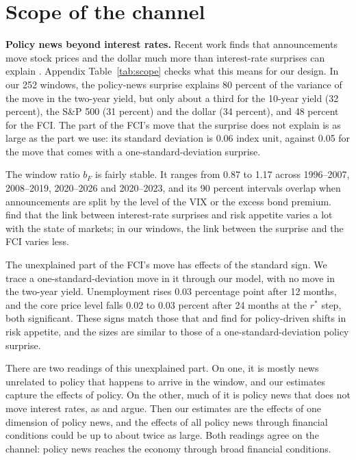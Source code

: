 \documentclass[11pt]{article}
\newcommand{\rs}{r^{*}}
\begin{document}
\section{Scope of the channel}\label{sec:scope}
\textbf{Policy news beyond interest rates.} Recent work finds that announcements move stock prices and the dollar much more than interest-rate surprises can explain \citep{boehm2024,bauer2026}. Appendix Table~\ref{tab:scope} checks what this means for our design. In our 252 windows, the policy-news surprise explains 80 percent of the variance of the move in the two-year yield, but only about a third for the 10-year yield (32 percent), the S\&P 500 (31 percent) and the dollar (34 percent), and 48 percent for the FCI. The part of the FCI's move that the surprise does not explain is as large as the part we use: its standard deviation is 0.06 index unit, against 0.05 for the move that comes with a one-standard-deviation surprise.

The window ratio $b_F$ is fairly stable. It ranges from 0.87 to 1.17 across 1996--2007, 2008--2019, 2020--2026 and 2020--2023, and its 90 percent intervals overlap when announcements are split by the level of the VIX or the excess bond premium. \citet{bauer2026} find that the link between interest-rate surprises and risk appetite varies a lot with the state of markets; in our windows, the link between the surprise and the FCI varies less.

The unexplained part of the FCI's move has effects of the standard sign. We trace a one-standard-deviation move in it through our model, with no move in the two-year yield. Unemployment rises 0.03 percentage point after 12 months, and the core price level falls 0.02 to 0.03 percent after 24 months at the $\rs$ step, both significant. These signs match those that \citet{bauer2026} and \citet{boehm2026} find for policy-driven shifts in risk appetite, and the sizes are similar to those of a one-standard-deviation policy surprise.

There are two readings of this unexplained part. On one, it is mostly news unrelated to policy that happens to arrive in the window, and our estimates capture the effects of policy. On the other, much of it is policy news that does not move interest rates, as \citet{boehm2024} and \citet{bauer2026} argue. Then our estimates are the effects of one dimension of policy news, and the effects of all policy news through financial conditions could be up to about twice as large. Both readings agree on the channel: policy news reaches the economy through broad financial conditions.
\end{document}
